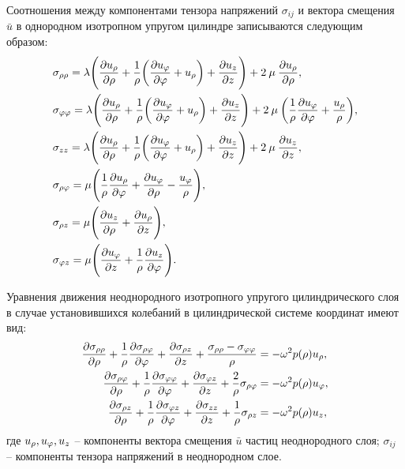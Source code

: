 Соотношения между компонентами тензора напряжений $\sigma_{ij}$ и вектора смещения $\bar{u}$ в однородном изотропном упругом цилиндре записываются следующим образом:
\begin{equation}\label{tenzor_napr}
\begin{aligned}
&\sigma_{\rho\rho}=\lambda\Biggl(\frac{\partial u_{\rho}}{\partial \rho}+\frac{1}{\rho}\biggl(\frac{\partial u_\varphi}{\partial\varphi}+u_{\rho}\biggr)+\frac{\partial u_z}{\partial z}\Biggr)+2\:\mu\:\frac{\partial u_{\rho}}{\partial \rho},\\
&\sigma_{\varphi\varphi}=\lambda\Biggl(\frac{\partial u_{\rho}}{\partial \rho}+\frac{1}{\rho}\biggl(\frac{\partial u_\varphi}{\partial\varphi}+u_{\rho}\biggr)+\frac{\partial u_z}{\partial z}\Biggr)+2\:\mu\:\biggl(\frac{1}{\rho}\frac{\partial u_\varphi}{\partial\varphi}+\frac{u_{\rho}}{\rho}\biggr),\\
&\sigma_{zz}=\lambda\Biggl(\frac{\partial u_{\rho}}{\partial \rho}+\frac{1}{\rho}\biggl(\frac{\partial u_\varphi}{\partial\varphi}+u_{\rho}\biggr)+\frac{\partial u_z}{\partial z}\Biggr)+2\:\mu\:\frac{\partial u_z}{\partial z},\\
&\sigma_{\rho\varphi}=\mu\Biggl(\frac{1}{\rho}\frac{\partial u_{\rho}}{\partial\varphi}+\frac{\partial u_\varphi}{\partial \rho}-\frac{u_{\varphi}}{\rho}\Biggr),\\
&\sigma_{\rho z}=\mu\Biggl(\frac{\partial u_z}{\partial \rho}+\frac{\partial u_{\rho}}{\partial z}\Biggr),\\
&\sigma_{\varphi z}=\mu\Biggl(\frac{\partial u_\varphi}{\partial z}+\frac{1}{\rho}\frac{\partial u_z}{\partial \varphi}\Biggr).
\end{aligned}
\end{equation}

Уравнения движения неоднородного изотропного упругого цилиндрического слоя в случае установившихся колебаний в цилиндрической системе координат имеют вид:
\begin{equation}\label{equation_dvij_splosh_sred}
\begin{aligned}
\frac{\partial\sigma_{\rho\rho}}{
\partial \rho}+\frac{1}{\rho}\frac{\partial\sigma_{\rho\varphi}}{\partial\varphi}+\frac{\partial\sigma_{\rho z}}{\partial z}+\frac{\sigma_{\rho\rho}-\sigma_{\varphi\varphi}}{\rho}&=-\omega^2 p(\rho)u_{\rho},\\
\frac{\partial\sigma_{\rho\varphi}}{
\partial \rho}+\frac{1}{\rho}\frac{\partial\sigma_{\varphi\varphi}}{\partial\varphi}+\frac{\partial\sigma_{\varphi z}}{\partial z}+\frac{2}{\rho}\sigma_{\rho\varphi}&=-\omega^2 p(\rho)u_{\varphi},\\
\frac{\partial\sigma_{\rho z}}{
\partial \rho}+\frac{1}{\rho}\frac{\partial\sigma_{\varphi z}}{\partial\varphi}+\frac{\partial\sigma_{zz}}{\partial z}+\frac{1}{\rho}\sigma_{\rho z}&=-\omega^2 p(\rho)u_z,
\end{aligned}
\end{equation}
где $u_{\rho}, u_{\varphi}, u_z$ -- компоненты вектора смещения $\bar{u}$ частиц неоднородного слоя; $\sigma_{ij}$ -- компоненты тензора напряжений в неоднородном слое.

